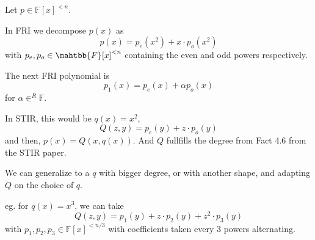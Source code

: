 \documentclass{article}
\theoremstyle{definition}
\begin{document}
\vspace{0.3cm}
Let $p \in \mathbb{F}[x]^{<n}$.

In FRI we decompose $p(x)$ as
$$p(x) = p_e(x^2) + x \cdot p_o(x^2)$$
with $p_e, p_o \in \mahtbb{F}[x]^{<n}$ containing the even and odd powers respectively.

The next FRI polynomial is
$$p_1(x) = p_e(x) + \alpha p_o(x)$$
for $\alpha \in^R \mathbb{F}$.

In STIR, this would be $q(x)=x^2$,
$$Q(z,y) = p_e(y) + z \cdot p_o(y)$$
and then, $p(x) = Q(x, q(x))$. And $Q$ fullfills the degree from Fact 4.6 from the STIR paper.

We can generalize to a $q$ with bigger degree, or with another shape, and adapting $Q$ on the choice of $q$.

eg. for $q(x)=x^3$, we can take
$$Q(z,y) = p_1(y) + z \cdot p_2(y) + z^2 \cdot p_3(y)$$
with $p_1, p_2, p_3 \in \mathbb{F}[x]^{<n/3}$ with coefficients taken every 3 powers alternating.



\end{document}
